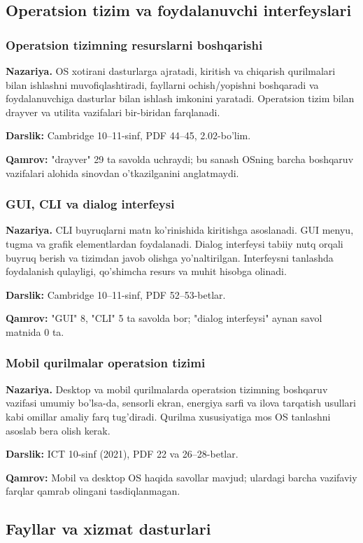 \documentclass[10pt,a4paper]{article}
\begin{document}
\subsection{Operatsion tizim va foydalanuvchi interfeyslari}
\subsubsection*{Operatsion tizimning resurslarni boshqarishi}
\textbf{Nazariya.} OS xotirani dasturlarga ajratadi, kiritish
va chiqarish qurilmalari bilan ishlashni muvofiqlashtiradi,
fayllarni ochish/yopishni boshqaradi va foydalanuvchiga
dasturlar bilan ishlash imkonini yaratadi. Operatsion tizim
bilan drayver va utilita vazifalari bir-biridan farqlanadi.
\par\textbf{Darslik:} Cambridge 10--11-sinf, PDF 44--45,
2.02-bo'lim.
\par\textbf{Qamrov:} "drayver" 29 ta savolda uchraydi;
bu sanash OSning barcha boshqaruv vazifalari alohida
sinovdan o'tkazilganini anglatmaydi.
\subsubsection*{GUI, CLI va dialog interfeysi}
\textbf{Nazariya.} CLI buyruqlarni matn ko'rinishida kiritishga
asoslanadi. GUI menyu, tugma va grafik elementlardan foydalanadi.
Dialog interfeysi tabiiy nutq orqali buyruq berish va
tizimdan javob olishga yo'naltirilgan. Interfeysni tanlashda
foydalanish qulayligi, qo'shimcha resurs va muhit hisobga olinadi.
\par\textbf{Darslik:} Cambridge 10--11-sinf, PDF 52--53-betlar.
\par\textbf{Qamrov:} "GUI" 8, "CLI" 5 ta savolda bor;
"dialog interfeysi" aynan savol matnida 0 ta.
\subsubsection*{Mobil qurilmalar operatsion tizimi}
\textbf{Nazariya.} Desktop va mobil qurilmalarda operatsion
tizimning boshqaruv vazifasi umumiy bo'lsa-da, sensorli
ekran, energiya sarfi va ilova tarqatish usullari kabi
omillar amaliy farq tug'diradi. Qurilma xususiyatiga
mos OS tanlashni asoslab bera olish kerak.
\par\textbf{Darslik:} ICT 10-sinf (2021), PDF 22 va 26--28-betlar.
\par\textbf{Qamrov:} Mobil va desktop OS haqida savollar mavjud;
ulardagi barcha vazifaviy farqlar qamrab olingani tasdiqlanmagan.
\subsection{Fayllar va xizmat dasturlari}
\end{document}
